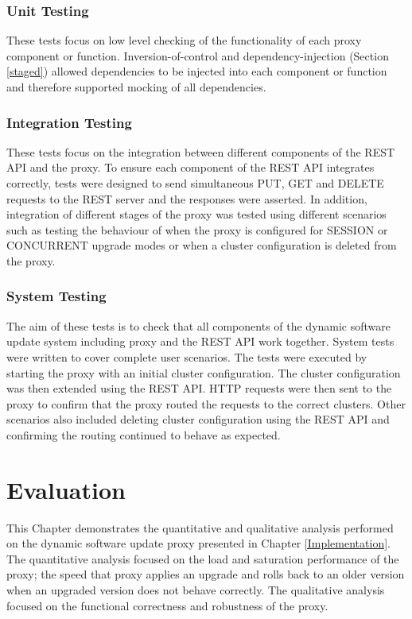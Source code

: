 \documentclass[a4paper,11pt,twoside]{report}
\begin{document}
\subsection{Unit Testing}
These tests focus on low level checking of the functionality of each proxy component or function. Inversion-of-control and dependency-injection (Section \ref{staged}) allowed dependencies to be injected into each component or function and therefore supported mocking of all dependencies.

\subsection{Integration Testing}
These tests focus on the integration between different components of the REST API and the proxy. To ensure each component of the REST API integrates correctly, tests were designed to send simultaneous PUT, GET and DELETE requests to the REST server and the responses were asserted. In addition, integration of different stages of the proxy was tested using different scenarios such as testing the behaviour of when the proxy is configured for SESSION or CONCURRENT upgrade modes or when a cluster configuration is deleted from the proxy.

\subsection{System Testing}
The aim of these tests is to check that all components of the dynamic software update system including proxy and the REST API work together. System tests were written to cover complete user scenarios. The tests were executed by starting the proxy with an initial cluster configuration. The cluster configuration was then extended using the REST API.  HTTP requests were then sent to the proxy to confirm that the proxy routed the requests to the correct clusters.  Other scenarios also included deleting cluster configuration using the REST API and confirming the routing continued to behave as expected.

\clearpage

\chapter{Evaluation}
This Chapter demonstrates the quantitative and qualitative analysis performed on the dynamic software update proxy presented in Chapter \ref{Implementation}. The quantitative analysis focused on the load and saturation performance of the proxy; the speed that proxy applies an upgrade and rolls back to an older version when an upgraded version does not behave correctly. The qualitative analysis focused on the functional correctness and robustness of the proxy. 
\end{document}
